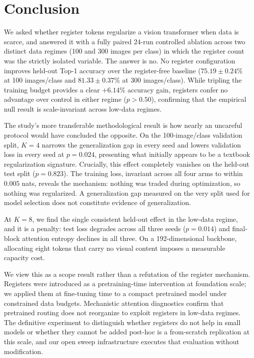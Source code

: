 \section{Conclusion}

We asked whether register tokens regularize a vision transformer when data is
scarce, and answered it with a fully paired 24-run controlled ablation across two
distinct data regimes (100 and 300 images per class) in which the register count
was the strictly isolated variable. The answer is no. No register configuration
improves held-out Top-1 accuracy over the register-free baseline ($75.19 \pm 0.24\%$
at 100 images/class and $81.33 \pm 0.37\%$ at 300 images/class). While tripling the
training budget provides a clear $+6.14\%$ accuracy gain, registers confer no
advantage over control in either regime ($p > 0.50$), confirming that the empirical
null result is scale-invariant across low-data regimes.

The study's more transferable methodological result is how nearly an uncareful
protocol would have concluded the opposite. On the 100-image/class validation split,
$K=4$ narrows the generalization gap in every seed and lowers validation loss in
every seed at $p = 0.024$, presenting what initially appears to be a textbook
regularization signature. Crucially, this effect completely vanishes on the held-out
test split ($p = 0.823$). The training loss, invariant across all four arms to within
$0.005$ nats, reveals the mechanism: nothing was traded during optimization, so
nothing was regularized. A generalization gap measured on the very split used for
model selection does not constitute evidence of generalization.

At $K=8$, we find the single consistent held-out effect in the low-data regime, and
it is a penalty: test loss degrades across all three seeds ($p = 0.014$) and
final-block attention entropy declines in all three. On a 192-dimensional backbone,
allocating eight tokens that carry no visual content imposes a measurable capacity cost.

We view this as a scope result rather than a refutation of the register mechanism.
Registers were introduced as a pretraining-time intervention at foundation scale;
we applied them at fine-tuning time to a compact pretrained model under constrained
data budgets. Mechanistic attention diagnostics confirm that pretrained routing does
not reorganize to exploit registers in low-data regimes. The definitive experiment to
distinguish whether registers do not help in small models or whether they cannot be
added post-hoc is a from-scratch replication at this scale, and our open sweep
infrastructure executes that evaluation without modification.
